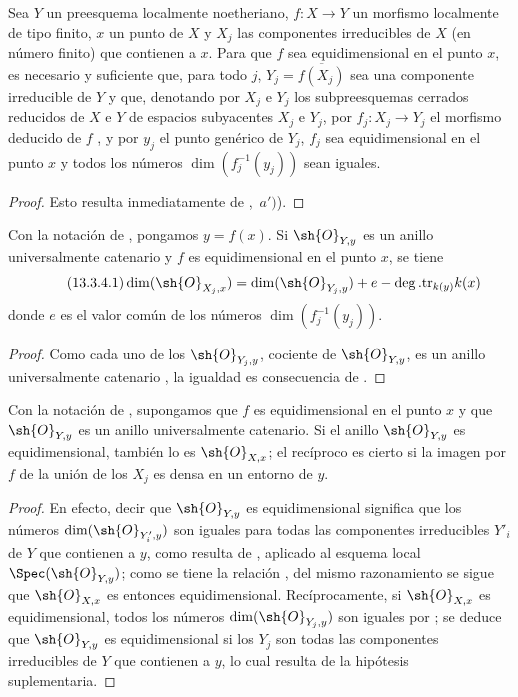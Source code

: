 \begin{proposition}[13.3.3]
\label{IV.13.3.3}
Sea $Y$ un preesquema localmente noetheriano, $f:X\to Y$ un morfismo localmente de tipo finito, $x$ un punto de $X$ y $X_j$ las componentes irreducibles de $X$ (en número finito) que contienen a $x$.
Para que $f$ sea equidimensional en el punto $x$, es necesario y suficiente que, para todo $j$, $Y_j=\overline{f(X_j)}$ sea una componente irreducible de $Y$ y que, denotando por $X_j$ e $Y_j$ los subpreesquemas cerrados reducidos de $X$ e $Y$ de espacios subyacentes $X_j$ e $Y_j$, por $f_j:X_j\to Y_j$ el morfismo deducido de $f$ , y por $y_j$ el punto genérico de $Y_j$, $f_j$ sea equidimensional en el punto $x$ y todos los números $\dim(f_j^{-1}(y_j))$ sean iguales.
\end{proposition}

\begin{proof}
Esto resulta inmediatamente de ,~$a')$).
\end{proof}

\begin{corollary}[13.3.4]
\label{IV.13.3.4}
Con la notación de , pongamos $y=f(x)$.
Si $\sh{O}_{Y,y}$ es un anillo universalmente catenario y $f$ es equidimensional en el punto $x$, se tiene
\[
\tag{13.3.4.1}
\label{IV.13.3.4.1}
  \dim(\sh{O}_{X_j,x})=\dim(\sh{O}_{Y_j,y})+e-\deg.\mathrm{tr}_{k(y)}k(x)
\]
donde $e$ es el valor común de los números $\dim(f_j^{-1}(y_j))$.
\end{corollary}

\begin{proof}
Como cada uno de los $\sh{O}_{Y_j,y}$, cociente de $\sh{O}_{Y,y}$, es un anillo universalmente catenario , la igualdad es consecuencia de .
\end{proof}

\begin{corollary}[13.3.5]
\label{IV.13.3.5}
Con la notación de , supongamos que $f$ es equidimensional en el punto $x$ y que $\sh{O}_{Y,y}$ es un anillo universalmente catenario.
Si el anillo $\sh{O}_{Y,y}$ es equidimensional, también lo es $\sh{O}_{X,x}$; el recíproco es cierto si la imagen por $f$ de la unión de los $X_j$ es densa en un entorno de $y$.
\end{corollary}

\begin{proof}
En efecto, decir que $\sh{O}_{Y,y}$ es equidimensional significa que los números $\dim(\sh{O}_{Y'_i,y})$ son iguales para todas las componentes irreducibles $Y'_i$ de $Y$ que contienen a $y$, como resulta de , aplicado al esquema local $\Spec(\sh{O}_{Y,y})$; como se tiene la relación , del mismo razonamiento se sigue que $\sh{O}_{X,x}$ es entonces equidimensional.
Recíprocamente, si $\sh{O}_{X,x}$ es equidimensional, todos los números $\dim(\sh{O}_{Y_j,y})$ son iguales por ; se deduce que $\sh{O}_{Y,y}$ es equidimensional si los $Y_j$ son todas las componentes irreducibles de $Y$ que contienen a $y$, lo cual resulta de la hipótesis suplementaria.
\end{proof}

